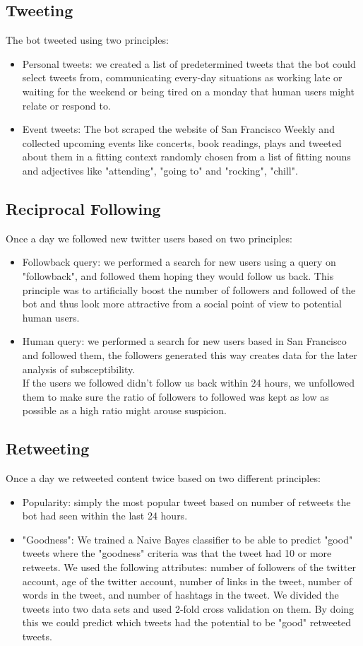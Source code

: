 \documentclass[10pt]{IEEEtran}
\begin{document}
\subsection{Tweeting}
The bot tweeted using two principles:
\begin{itemize}
\item Personal tweets: we created a list of predetermined tweets that the bot could select tweets from, communicating every-day situations as working late or waiting for the weekend or being tired on a monday that human users might relate or respond to.
\item Event tweets: The bot scraped the website of San Francisco Weekly and collected upcoming events like concerts, book readings, plays and tweeted about them in a fitting context randomly chosen from a list of fitting nouns and adjectives like "attending", "going to" and "rocking", "chill".
\end{itemize}
\subsection{Reciprocal Following}
Once a day we followed new twitter users based on two principles:
\begin{itemize}
\item Followback query: we performed a search for new users using a query on "followback", and followed them hoping they would follow us back. This principle was to artificially boost the number of followers and followed of the bot and thus look more attractive from a social point of view to potential human users.
\item Human query: we performed a search for new users based in San Francisco and followed them, the followers generated this way creates data for the later analysis of subsceptibility.\\
 If the users we followed didn't follow us back within 24 hours, we unfollowed them to make sure the ratio of followers to followed was kept as low as possible as a high ratio might arouse suspicion.
\end{itemize}
\subsection{Retweeting}
Once a day we retweeted content twice based on two different principles:
\begin{itemize}
\item Popularity: simply the most popular tweet based on number of retweets the bot had seen within the last 24 hours.
\item "Goodness": We trained a Naive Bayes classifier to be able to predict "good" tweets where the "goodness" criteria was that the tweet had 10 or more retweets. We used the following attributes: number of followers of the twitter account, age of the twitter account, number of links in the tweet, number of words in the tweet, and number of hashtags in the tweet. We divided the tweets into two data sets and used 2-fold cross validation on them. By doing this we could predict which tweets had the potential to be "good" retweeted tweets.
\end{itemize}
\end{document}
